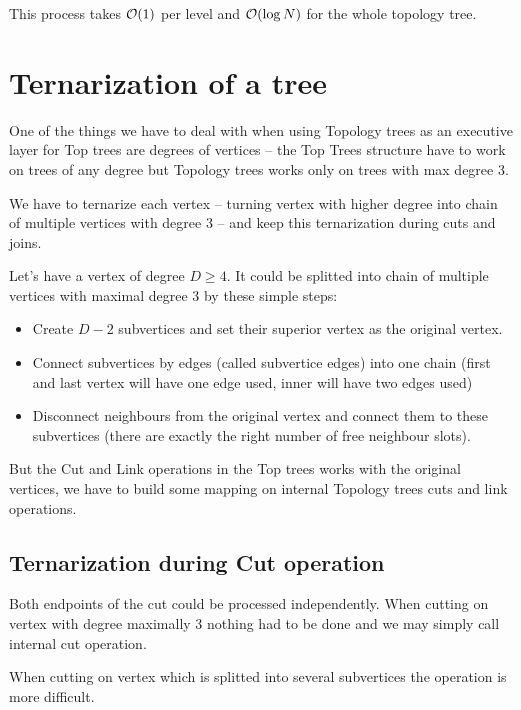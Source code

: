 This process takes ${\cal O}(1)$ per level and ${\cal O}(\log N)$ for the whole topology tree.


\section{Ternarization of a tree}

One of the things we have to deal with when using Topology trees as an executive
layer for Top trees are degrees of vertices -- the Top Trees structure have to
work on trees of any degree but Topology trees works only on trees with max
degree 3.

We have to {\I ternarize} each vertex -- turning vertex with higher degree into
chain of multiple vertices with degree 3 -- and keep this ternarization during
cuts and joins.

Let's have a vertex of degree $D\ge4$. It could be splitted into chain of
multiple vertices with maximal degree 3 by these simple steps:
\begin{itemize}
\item Create $D - 2$ {\I subvertices} and set their {\I superior vertex} as the
original vertex.
\item Connect subvertices by edges (called {\I subvertice edges}) into one chain (first
and last vertex will have one edge used, inner will have two edges used)
\item Disconnect neighbours from the original vertex and connect them to these
subvertices (there are exactly the right number of free neighbour slots).
\end{itemize}

But the Cut and Link operations in the Top trees works with the original
vertices, we have to build some mapping on internal Topology trees cuts and link
operations.

\subsection{Ternarization during Cut operation}

Both endpoints of the cut could be processed independently. When cutting on
vertex with degree maximally 3 nothing had to be done and we may simply call
internal cut operation.

When cutting on vertex which is splitted into several subvertices the operation
is more difficult.

